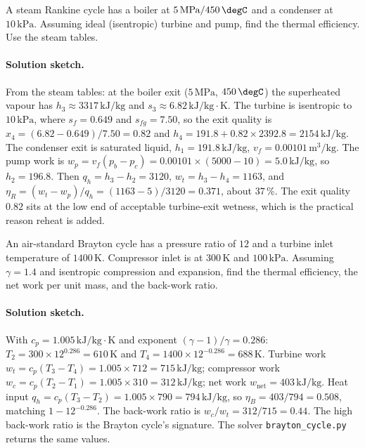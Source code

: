 \begin{exercise}
A steam Rankine cycle has a boiler at $5\,\text{MPa}/450\,\degC$ and
a condenser at $10\,\text{kPa}$. Assuming ideal (isentropic) turbine
and pump, find the thermal efficiency. Use the steam tables.

\paragraph{Solution sketch.} From the steam tables: at the boiler exit
($5\,\text{MPa}$, $450\,\degC$) the superheated vapour has $h_3 \approx
3317\,\text{kJ}/\text{kg}$ and $s_3 \approx 6.82\,\text{kJ}/\text{kg}
\cdot\text{K}$. The turbine is isentropic to $10\,\text{kPa}$, where
$s_f = 0.649$ and $s_{fg} = 7.50$, so the exit quality is $x_4 =
(6.82 - 0.649)/7.50 = 0.82$ and $h_4 = 191.8 + 0.82 \times 2392.8 =
2154\,\text{kJ}/\text{kg}$. The condenser exit is saturated liquid,
$h_1 = 191.8\,\text{kJ}/\text{kg}$, $v_f = 0.00101\,\text{m}^3/
\text{kg}$. The pump work is $w_p = v_f(p_b - p_c) = 0.00101 \times
(5000 - 10) = 5.0\,\text{kJ}/\text{kg}$, so $h_2 = 196.8$. Then $q_h =
h_3 - h_2 = 3120$, $w_t = h_3 - h_4 = 1163$, and $\eta_R = (w_t -
w_p)/q_h = (1163 - 5)/3120 = 0.371$, about $37\,\%$. The exit quality
$0.82$ sits at the low end of acceptable turbine-exit wetness, which is
the practical reason reheat is added.
\end{exercise}

\begin{exercise}
An air-standard Brayton cycle has a pressure ratio of $12$ and a
turbine inlet temperature of $1400\,\si{\kelvin}$. Compressor inlet
is at $300\,\si{\kelvin}$ and $100\,\text{kPa}$. Assuming
$\gamma = 1.4$ and isentropic compression and expansion, find the
thermal efficiency, the net work per unit mass, and the back-work
ratio.

\paragraph{Solution sketch.} With $c_p = 1.005\,\text{kJ}/\text{kg}
\cdot\text{K}$ and exponent $(\gamma-1)/\gamma = 0.286$: $T_2 = 300
\times 12^{0.286} = 610\,\si{\kelvin}$ and $T_4 = 1400 \times
12^{-0.286} = 688\,\si{\kelvin}$. Turbine work $w_t = c_p(T_3 - T_4) =
1.005 \times 712 = 715\,\text{kJ}/\text{kg}$; compressor work $w_c =
c_p(T_2 - T_1) = 1.005 \times 310 = 312\,\text{kJ}/\text{kg}$; net work
$w_{\text{net}} = 403\,\text{kJ}/\text{kg}$. Heat input $q_h = c_p(T_3 -
T_2) = 1.005 \times 790 = 794\,\text{kJ}/\text{kg}$, so $\eta_B =
403/794 = 0.508$, matching $1 - 12^{-0.286}$. The back-work ratio is
$w_c/w_t = 312/715 = 0.44$. The high back-work ratio is the Brayton
cycle's signature. The solver \texttt{brayton\_cycle.py} returns the
same values.
\end{exercise}

